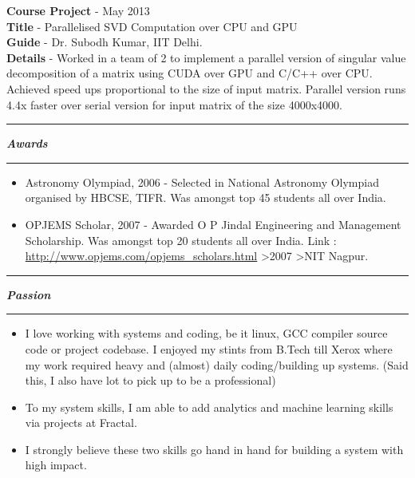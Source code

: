 \documentclass[10pt]{article}
\begin{document}
\vspace{7pt}

\parbox{0.97\textwidth}{
{\bf Course Project} - May 2013 \\
{\bf Title} - Parallelised SVD Computation over CPU and GPU \\
{\bf Guide} - Dr. Subodh Kumar, IIT Delhi.\\
{\bf Details} - Worked in a team of 2 to implement a parallel version of singular value decomposition of a matrix using CUDA over GPU and C/C++ over CPU. Achieved speed ups proportional to the size of input matrix. Parallel version runs 4.4x faster over serial version for input matrix of the size 4000x4000.
}

\vspace{10pt}


\vspace{6pt}
\hrule
\vspace{3pt}
{\Large \bfseries \slshape \sc Awards}
\vspace{3pt}
\hrule
\begin{itemize}
\item Astronomy Olympiad, 2006 -  Selected in National Astronomy Olympiad organised by HBCSE, TIFR. Was
amongst top 45 students all over India.
\item OPJEMS Scholar, 2007 - Awarded O P Jindal Engineering and Management Scholarship. Was amongst top 20
students all over India. Link : \url{http://www.opjems.com/opjems_scholars.html} \textgreater 2007 \textgreater NIT Nagpur. 
\end{itemize}

\hrule
\vspace{3pt}
{\Large \bfseries \slshape \sc Passion}
\vspace{3pt}
\hrule
\begin{itemize}
\item I love working with systems and coding, be it linux, GCC compiler source code or project codebase. I enjoyed my stints from B.Tech till Xerox where my work required heavy and (almost) daily coding/building up systems. (Said this, I also have lot to pick up to be a professional)
\item To my system skills, I am able to add analytics and machine learning skills via projects at Fractal.
\item I strongly believe these two skills go hand in hand for building a system with high impact.
\end{itemize}
\end{document}
